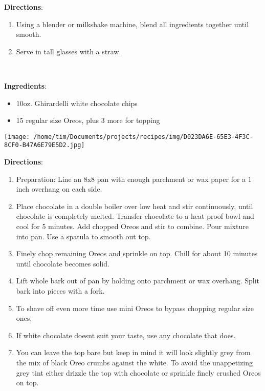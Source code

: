 \documentclass[11pt, twoside, openany]{book}
\begin{document}
\textbf{Directions}:
\vspace{-3mm}\begin{enumerate}\setlength\itemsep{-1mm}
\item  Using a blender or milkshake machine, blend all ingredients together until smooth.
\item Serve in tall glasses with a straw. 
\end{enumerate}
 \label{cookies-and-cream-oreo-bark}\hfill\textit{}\\
\begin{minipage}[t]{0.8\linewidth}
\textbf{Ingredients}:\vspace{-3mm}
\begin{multicols}{2}
\begin{itemize}\setlength\itemsep{-1mm}
\item 10oz. Ghirardelli white chocolate chips
\item 15 regular size Oreos, plus 3 more for topping
\end{itemize}
\end{multicols}
\end{minipage}
\begin{minipage}[t]{0.2\linewidth}
\centering \strut\vspace*{-\baselineskip}\newline
\texttt{[image: /home/tim/Documents/projects/recipes/img/D023DA6E-65E3-4F3C-8CF0-B47A6E79E5D2.jpg]}\\
\end{minipage}\vspace{3mm}
\textbf{Directions}:
\vspace{-3mm}\begin{enumerate}\setlength\itemsep{-1mm}
\item Preparation: Line an 8x8 pan with enough parchment or wax paper for a 1 inch overhang on each side.
\item Place chocolate in a double boiler over low heat and stir continuously, until chocolate is completely melted. Transfer chocolate to a heat proof bowl and cool for 5 minutes. Add chopped Oreos and stir to combine. Pour mixture into pan. Use a spatula to smooth out top.
\item Finely chop remaining Oreos and sprinkle on top. Chill for about 10 minutes until chocolate becomes solid.
\item Lift whole bark out of pan by holding onto parchment or wax overhang. Split bark into pieces with a fork.
\item To shave off even more time use mini Oreos to bypass chopping regular size ones.
\item If white chocolate doesnt suit your taste, use any chocolate that does.
\item You can leave the top bare but keep in mind it will look slightly grey from the mix of black Oreo crumbs against the white. To avoid the unappetizing grey tint either drizzle the top with chocolate or sprinkle finely crushed Oreos on top.
\end{enumerate}
\end{document}

